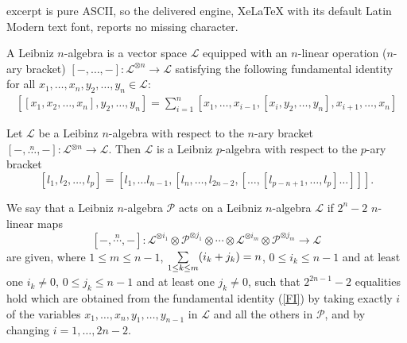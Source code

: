 \documentclass[10pt,a4paper]{amsart}
\newcommand{\ele}{\mathcal L} \newcommand{\de}{\mathcal D} \newcommand{\ka}{\mathcal K}
\begin{document}
excerpt is pure ASCII, so the delivered engine, XeLaTeX with its default Latin Modern text font, reports no missing character.
\begin{definition}  A Leibniz $n$-algebra  is a vector space ${\ele}$
equipped with an $n$-linear operation ($n$-ary bracket) $[-, \dots,-] : {\ele}^{\otimes n} \to {\ele}$  satisfying the following fundamental identity for all $x_1, \dots, x_n, y_2, \dots, y_n \in {\ele}$:
\begin{equation} \label{FI}
\begin{array}{l}
[[x_1, x_2, \dots, x_n],y_2,\dots,y_{n}] =
  \displaystyle \sum_{i=1}^n [x_1,\dots, x_{i-1}, [ x_i,y_2,\dots,
y_{n}],x_{i+1},\dots,x_n]
\end{array}
\end{equation}
\end{definition}

\begin{proposition} \label{leib}
Let ${\ele}$ be a Leibinz $n$-algebra with respect to the $n$-ary bracket \linebreak $[-,\stackrel{n}\dots,-] : {\ele}{^{\otimes n}} \to \ele$. Then ${\ele}$ is a Leibniz $p$-algebra  with respect to the $p$-ary bracket
\[
[l_1,l_2,\dots,l_{p}]
  =[l_1, \dots l_{n-1},[l_n, \dots, l_{2n-2}, [\dots,[l_{p-n+1}, \dots, l_{p}] \dots]]].
\]
\end{proposition}

\begin{definition}\label{Def action} We say that a Leibniz $n$-algebra $\mathcal{P}$ acts on
a Leibniz $n$-algebra $\mathcal{L}$ if $2^n-2$ $n$-linear maps
\[
[-,\stackrel{n}{\cdots},-]:\mathcal{L}^{\otimes i_1}\otimes \mathcal{P}^{\otimes
j_1}\otimes\cdots\otimes \mathcal{L}^{\otimes i_m}\otimes
\mathcal{P}^{\otimes j_m}\to \mathcal{L}
\]
are given, where $1\leq m\leq n-1$, $\underset{\scriptsize{1\leq
k\leq m}}\sum (i_k+j_k)=n$, $0\leq i_k \leq n-1$ and at least one
$i_k\neq 0$, $0\leq j_k \leq n-1$ and at least one $j_k\neq 0$,
such that $2^{2n-1}-2$ equalities hold which are obtained from the fundamental identity
(\ref{FI}) by taking exactly $i$ of the variables
$x_1,\dots,x_n,y_1,\dots, y_{n-1}$ in $\mathcal{L}$ and all the
others in $\mathcal{P}$, %
and by changing $i=1,\dots,2n-2$.

\end{definition}
\end{document}
